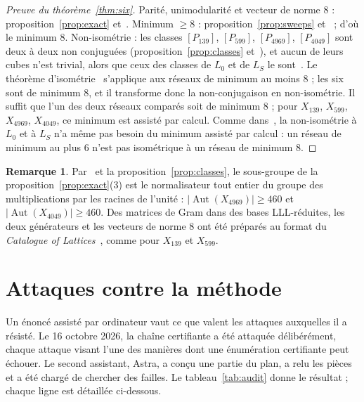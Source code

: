 \documentclass[11pt,a4paper]{amsart}
\theoremstyle{plain}
\theoremstyle{definition}
\newtheorem{remark}[proposition]{Remarque}
\DeclareMathOperator{\Aut}{Aut}
\newcommand{\Lz}{L_{0}}
\newcommand{\LS}{L_{S}}
\begin{document}
\begin{proof}[Preuve du théorème~\ref{thm:six}]
Parité, unimodularité et vecteur de norme $8$ : proposition~\ref{prop:exact} et~\cite[prop.~6.3, 6.4]{Gau26}. Minimum $\ge8$ : proposition~\ref{prop:sweeps} et~\cite[th.~6.11]{Gau26} ; d'où le minimum $8$. Non-isométrie : les classes $[P_{139}]$, $[P_{599}]$, $[P_{4969}]$, $[P_{4049}]$ sont deux à deux non conjuguées (proposition~\ref{prop:classes} et~\cite[rem.~6.10]{Gau26}), et aucun de leurs cubes n'est trivial, alors que ceux des classes de $\Lz$ et de $\LS$ le sont~\cite[prop.~2.7]{Gau26}. Le théorème d'isométrie~\cite[th.~3.3]{Gau26} s'applique aux réseaux de minimum au moins $8$ ; les six sont de minimum $8$, et il transforme donc la non-conjugaison en non-isométrie. Il suffit que l'un des deux réseaux comparés soit de minimum $8$ ; pour $X_{139}$, $X_{599}$, $X_{4969}$, $X_{4049}$, ce minimum est assisté par calcul. Comme dans~\cite[prop.~6.9(a)]{Gau26}, la non-isométrie à $\Lz$ et à $\LS$ n'a même pas besoin du minimum assisté par calcul : un réseau de minimum au plus $6$ n'est pas isométrique à un réseau de minimum $8$.
\end{proof}

\begin{remark}
Par~\cite[rem.~2.6]{Gau26} et la proposition~\ref{prop:classes}, le sous-groupe de la proposition~\ref{prop:exact}(3) est le normalisateur tout entier du groupe des multiplications par les racines de l'unité : $|\Aut(X_{4969})|\ge460$ et $|\Aut(X_{4049})|\ge460$. Des matrices de Gram dans des bases LLL-réduites, les deux générateurs et les vecteurs de norme $8$ ont été préparés au format du \emph{Catalogue of Lattices}~\cite{NS}, comme pour $X_{139}$ et $X_{599}$.
\end{remark}

\section{Attaques contre la méthode}\label{sec:audit}

Un énoncé assisté par ordinateur vaut ce que valent les attaques auxquelles il a résisté. Le 16 octobre 2026, la chaîne certifiante a été attaquée délibérément, chaque attaque visant l'une des manières dont une énumération certifiante peut échouer. Le second assistant, Astra, a conçu une partie du plan, a relu les pièces et a été chargé de chercher des failles. Le tableau~\ref{tab:audit} donne le résultat ; chaque ligne est détaillée ci-dessous.
\end{document}
